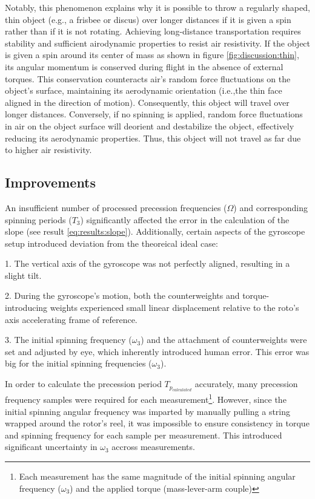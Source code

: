 \begin{multicols}{2}
Notably, this phenomenon explains why it is possible to throw a regularly shaped, thin object (e.g., a frisbee or discus) over longer distances if it is given a spin rather than if it is not rotating. Achieving long-distance transportation requires stability and sufficient airodynamic properties to resist air resistivity. If the object is given a spin around its center of mass as shown in figure \ref{fig:discussion:thin}, its angular momentum is conserved during flight in the absence of external torques. This conservation counteracts air's random force fluctuations on the object's surface, maintaining its aerodynamic orientation (i.e.,the thin face aligned in the direction of motion). Consequently, this object will travel over longer distances. Conversely, if no spinning is applied, random force fluctuations in air on the object surface will deorient and destabilize the object, effectively reducing its aerodynamic properties. Thus, this object will not travel as far due to higher air resistivity. 

\subsection{Improvements} \label{sec:discussion:improvements}

An insufficient number of processed precession frequencies ($\Omega$) and corresponding spinning periods ($T_{3}$) significantly affected the error in the calculation of the slope (see result \ref{eq:results:slope}). Additionally, certain aspects of the gyroscope setup introduced deviation from the theoreical ideal case:

1. The vertical axis of the gyroscope was not perfectly aligned, resulting in a slight tilt.

2. During the gyroscope's motion, both the counterweights and torque-introducing weights experienced small linear displacement relative to the roto's axis accelerating frame of reference.

3. The initial spinning frequency ($\omega_{3}$) and the attachment of counterweights were set and adjusted by eye, which inherently introduced human error. This error was big for the initial spinning frequencies ($\omega_{3}$).

In order to calculate the precession period $T_{p_{calculated}}$ accurately, many precession frequency samples were required for each measurement\footnote{Each measurement has the same magnitude of the initial spinning angular frequency ($\omega_{3}$) and the applied torque (mass-lever-arm couple)}. However, since the initial spinning angular frequency was imparted by manually pulling a string wrapped around the rotor's reel, it was impossible to ensure consistency in torque and spinning frequency for each sample per measurement. This introduced significant uncertainty in $\omega_{3}$ accross measurements.


\end{multicols}

